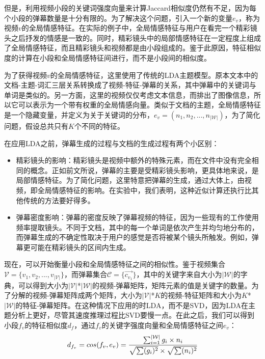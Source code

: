 但是，利用视频小段的关键词强度向量来计算Jaccard相似度仍然有不足，因为每个小段的弹幕数量是十分有限的。为了解决这个问题，引入一个新的变量$e_v$，称为视频$v$的全局情感特征。在实际的例子中，全局情感特征与用户在看完一个精彩镜头之后抒发的情感是一致的。同时，精彩镜头中的局部情感特征在一定程度上组成了全局情感特征，而且精彩镜头和视频都是由小段组成的。鉴于此原因，特征相似度的计算在小段和全局情感特征间进行，而不是小段间的相似度。

为了获得视频$v$的全局情感特征，这里使用了传统的LDA主题模型。原本文本中的文档-主题-词汇三层关系转换成了视频-特征-弹幕的关系，其中弹幕中的关键词与单词是类似的。另一方面，这里的视频仅仅考虑文本信息，而排出了图像信息，所以它可以表示为一个带有权重的全局情感向量。类似于文档的主题，全局情感特征是一个隐藏变量，并定义为关于关键词的分布，$e_v=(n_1, n_2,...,n_{|\mathcal{W}|})$，为了简化问题，假设总共只有$K$个不同的特征。

在应用LDA之前，弹幕生成的过程与文档的生成过程有两个小区别：
\begin{itemize}
\item 精彩镜头的影响：精彩镜头是视频中额外的特殊元素，而在文件中没有完全相同的概念。正如前文所说，弹幕的主要是受精彩镜头影响，更具体地来说，是局部情感特征。为了简化问题，这里特意把弹幕的生成，通过大体上，由视频，即全局情感特征的影响。在实验中，我们表明，这种近似计算还执行比其他传统的方法要好得多。
\item 弹幕密度影响：弹幕的密度反映了弹幕视频的特征，因为一些现有的工作使用频率提取镜头。不同于文档，其中的每一个单词是依次产生并均匀地分布的，而弹幕生成的不确定性取决于用户的感觉是否将被某个镜头所触发。例如，弹幕更可能在精彩镜头的区间内生成。 
\end{itemize}

现在，可以开始衡量小段和全局情感特征之间的相似性。鉴于视频集合$\mathcal{V}=\{v_1, v_2,..., v_{|\mathcal{V}|}\}$，而弹幕集合$\mathcal{C}=\{\vec{c_{v_1}}\}$，其中的关键字来自大小为$|\mathcal{W}|$的字典，可以得到大小为$|\mathcal{V}|$*$|\mathcal{W}|$的视频-弹幕矩阵，矩阵元素的值是关键字的数量。为了分解的视频-弹幕矩阵成两个矩阵，大小为$|\mathcal{V}|$*$K$的视频-特征矩阵和大小为$K$*$|\mathcal{W}|$的特征-弹幕矩阵。在这种情况下应用的时LDA，而不是SVD，因为LDA在主题分析上更好，尽管其速度推理过程比SVD要慢一点。在此之后，我们可以得到小段$f_v$的特征相似度$d_f$，通过$f_v$的关键字强度向量和全局情感特征之间$ e_v$：
\begin{equation}
d_{f_v}=cos(f_v,e_v)=\frac{\sum_{i=1}^{|\mathcal{W}|}g_i \times n_i}{%
\sqrt{\sum(g_i)^2} \times \sqrt{\sum(n_i)^2}}
\end{equation}

